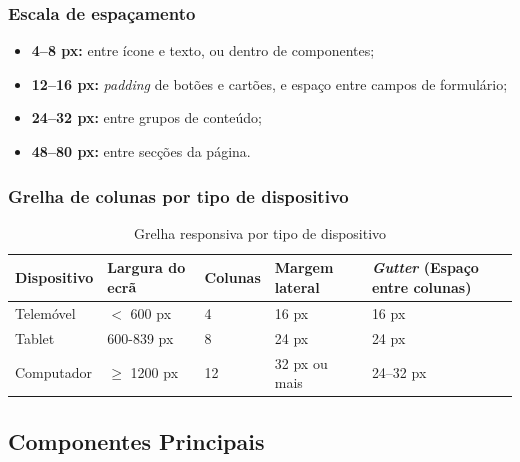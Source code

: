 \subsubsection{Escala de espaçamento}

\begin{itemize}
    \item \textbf{4–8 px:} entre ícone e texto, ou dentro de componentes;
    \item \textbf{12–16 px:} \textit{padding} de botões e cartões, e espaço entre campos de formulário;
    \item \textbf{24–32 px:} entre grupos de conteúdo;
    \item \textbf{48–80 px:} entre secções da página.
\end{itemize}

\subsubsection{Grelha de colunas por tipo de dispositivo}

\begin{table}[H]
    \centering
    \renewcommand{\arraystretch}{1.1}
    \begin{tabularx}{\textwidth}{@{}l L L L L@{}}
        \toprule
        \textbf{Dispositivo} & \textbf{Largura do ecrã} & \textbf{Colunas} & \textbf{Margem lateral} & \textbf{\textit{Gutter} (Espaço entre colunas)} \\
        \midrule
        Telemóvel  & $<$ 600 px     & 4  & 16 px         & 16 px \\
        \midrule
        Tablet     & 600-839 px    & 8  & 24 px         & 24 px \\
        \midrule
        Computador & $\geq$ 1200 px & 12 & 32 px ou mais & 24--32 px \\
        \bottomrule
    \end{tabularx}
    \caption{Grelha responsiva por tipo de dispositivo}
    \label{tab:grelha}
\end{table}



\subsection{Componentes Principais}

